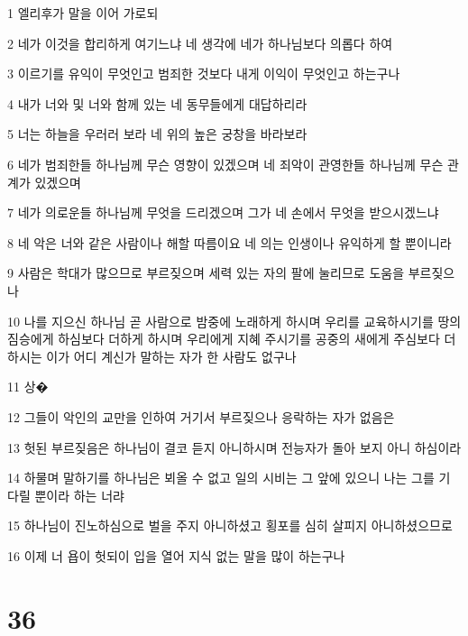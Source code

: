 \par 1 엘리후가 말을 이어 가로되
\par 2 네가 이것을 합리하게 여기느냐 네 생각에 네가 하나님보다 의롭다 하여
\par 3 이르기를 유익이 무엇인고 범죄한 것보다 내게 이익이 무엇인고 하는구나
\par 4 내가 너와 및 너와 함께 있는 네 동무들에게 대답하리라
\par 5 너는 하늘을 우러러 보라 네 위의 높은 궁창을 바라보라
\par 6 네가 범죄한들 하나님께 무슨 영향이 있겠으며 네 죄악이 관영한들 하나님께 무슨 관계가 있겠으며
\par 7 네가 의로운들 하나님께 무엇을 드리겠으며 그가 네 손에서 무엇을 받으시겠느냐
\par 8 네 악은 너와 같은 사람이나 해할 따름이요 네 의는 인생이나 유익하게 할 뿐이니라
\par 9 사람은 학대가 많으므로 부르짖으며 세력 있는 자의 팔에 눌리므로 도움을 부르짖으나
\par 10 나를 지으신 하나님 곧 사람으로 밤중에 노래하게 하시며 우리를 교육하시기를 땅의 짐승에게 하심보다 더하게 하시며 우리에게 지혜 주시기를 공중의 새에게 주심보다 더하시는 이가 어디 계신가 말하는 자가 한 사람도 없구나
\par 11 상�
\par 12 그들이 악인의 교만을 인하여 거기서 부르짖으나 응락하는 자가 없음은
\par 13 헛된 부르짖음은 하나님이 결코 듣지 아니하시며 전능자가 돌아 보지 아니 하심이라
\par 14 하물며 말하기를 하나님은 뵈올 수 없고 일의 시비는 그 앞에 있으니 나는 그를 기다릴 뿐이라 하는 너랴
\par 15 하나님이 진노하심으로 벌을 주지 아니하셨고 횡포를 심히 살피지 아니하셨으므로
\par 16 이제 너 욥이 헛되이 입을 열어 지식 없는 말을 많이 하는구나

\chapter{36}

